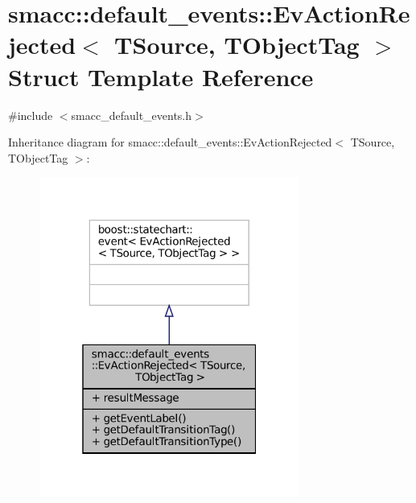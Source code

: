 \hypertarget{structsmacc_1_1default__events_1_1EvActionRejected}{}\section{smacc\+:\+:default\+\_\+events\+:\+:Ev\+Action\+Rejected$<$ T\+Source, T\+Object\+Tag $>$ Struct Template Reference}
\label{structsmacc_1_1default__events_1_1EvActionRejected}


{\ttfamily \#include $<$smacc\+\_\+default\+\_\+events.\+h$>$}



Inheritance diagram for smacc\+:\+:default\+\_\+events\+:\+:Ev\+Action\+Rejected$<$ T\+Source, T\+Object\+Tag $>$\+:
\nopagebreak
\begin{figure}[H]
\begin{center}
\leavevmode
\includegraphics[width=241pt]{structsmacc_1_1default__events_1_1EvActionRejected__inherit__graph}
\end{center}
\end{figure}


